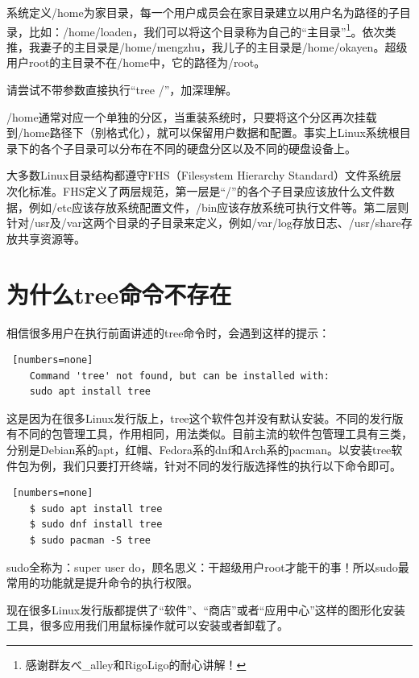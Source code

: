 \par 系统定义/home为家目录，每一个用户成员会在家目录建立以用户名为路径的子目录，比如：/home/loaden，我们可以将这个目录称为自己的“主目录”\footnote{感谢群友{べ\hspace{0em}\_alley}和RigoLigo的耐心讲解！}。依次类推，我妻子的主目录是/home/mengzhu，我儿子的主目录是/home/okayen。超级用户root的主目录不在/home中，它的路径为/root。
\par 请尝试不带参数直接执行“{tree\hspace{0.3em} /}”，加深理解。
\par /home通常对应一个单独的分区，当重装系统时，只要将这个分区再次挂载到/home路径下（别格式化），就可以保留用户数据和配置。事实上Linux系统根目录下的各个子目录可以分布在不同的硬盘分区以及不同的硬盘设备上。
\par 大多数Linux目录结构都遵守FHS（Filesystem Hierarchy Standard）文件系统层次化标准。FHS定义了两层规范，第一层是“/”的各个子目录应该放什么文件数据，例如/etc应该存放系统配置文件，/bin应该存放系统可执行文件等。第二层则针对/usr及/var这两个目录的子目录来定义，例如/var/log存放日志、/usr/share存放共享资源等。


\section{为什么tree命令不存在}

\par 相信很多用户在执行前面讲述的tree命令时，会遇到这样的提示：
\begin{lstlisting} [numbers=none]
    Command 'tree' not found, but can be installed with:
    sudo apt install tree
\end{lstlisting}

\par 这是因为在很多Linux发行版上，tree这个软件包并没有默认安装。不同的发行版有不同的包管理工具，作用相同，用法类似。目前主流的软件包管理工具有三类，分别是Debian系的apt，红帽、Fedora系的dnf和Arch系的pacman。以安装tree软件包为例，我们只要打开终端，针对不同的发行版选择性的执行以下命令即可。
\begin{lstlisting} [numbers=none]
    $ sudo apt install tree
    $ sudo dnf install tree
    $ sudo pacman -S tree
\end{lstlisting}

\par sudo全称为：super user do，顾名思义：干超级用户root才能干的事！所以sudo最常用的功能就是提升命令的执行权限。
\par 现在很多Linux发行版都提供了“软件”、“商店”或者“应用中心”这样的图形化安装工具，很多应用我们用鼠标操作就可以安装或者卸载了。

